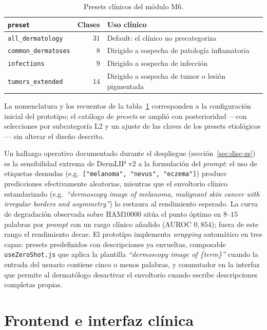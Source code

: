 \begin{table}[H]
\centering
\footnotesize
\setlength{\tabcolsep}{4pt}
\renewcommand{\arraystretch}{0.95}
\caption{Presets clínicos del módulo M6.}
\label{tab:dermapixel-presets}
\begin{tabular}{lrl}
\hline
\texttt{preset}            & Clases & Uso clínico \\
\hline
\texttt{all\_dermatology}  & $31$   & Default: el clínico no precategoriza \\
\texttt{common\_dermatoses}& $8$    & Dirigido a sospecha de patología inflamatoria \\
\texttt{infections}        & $9$    & Dirigido a sospecha de infección \\
\texttt{tumors\_extended}  & $14$   & Dirigido a sospecha de tumor o lesión pigmentada \\
\hline
\end{tabular}
\end{table}

La nomenclatura y los recuentos de la tabla~\ref{tab:dermapixel-presets}
corresponden a la configuración inicial del prototipo; el catálogo de
\emph{presets} se amplió con posterioridad ---con selecciones por
subcategoría L2 y un ajuste de las claves de los presets
etiológicos--- sin alterar el diseño descrito.

Un hallazgo operativo documentado durante el despliegue
(sección~\ref{sec:disc-zs}) es la sensibilidad extrema de DermLIP v2 a
la formulación del \emph{prompt}: el uso de etiquetas
desnudas (e.g.\ \texttt{["melanoma", "nevus", "eczema"]}) produce
predicciones efectivamente aleatorias, mientras que el envoltorio
clínico estandarizado (e.g.~\emph{``dermoscopy image of melanoma,
malignant skin cancer with irregular borders and asymmetry''}) lo
restaura al rendimiento esperado. La curva de degradación
observada sobre HAM10000 sitúa el punto óptimo en
$8$--$15$ palabras por \emph{prompt} con un rasgo clínico
añadido (AUROC $0{,}854$); fuera de este rango el rendimiento
decae. El prototipo implementa \emph{wrapping} automático en tres
capas: presets predefinidos con descripciones ya envueltas,
composable \texttt{useZeroShot.js} que aplica la plantilla
\emph{``dermoscopy image of \{term\}''} cuando la entrada del
usuario contiene cinco o menos palabras, y conmutador en la
interfaz que permite al dermatólogo desactivar el envoltorio
cuando escribe descripciones completas propias.

\section{Frontend e interfaz clínica}
\label{sec:dermapixel-frontend}


